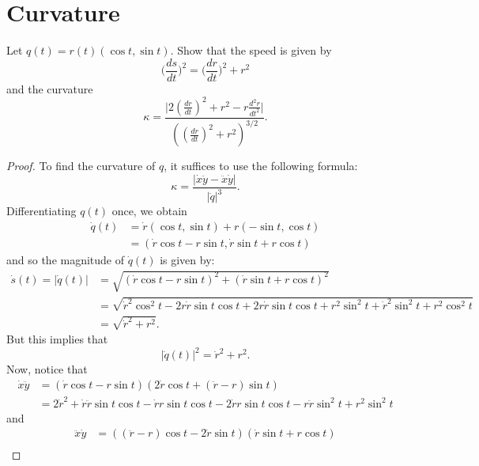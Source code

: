 \documentclass[a4paper]{article}
\begin{document}
\section{Curvature}

\begin{problem}
    Let \( q(t) = r(t) (\cos t , \sin t ) \). Show that the speed is given by
    \[  \Big(  \frac{ ds  }{ dt }  \Big)^{2} = \Big(  \frac{ dr }{ dt }  \Big)^{2} + r^{2} \]
    and the curvature 
    \[  \kappa = \frac{ \Big| 2 (\frac{ dr }{ dt })^{2} + r^{2} - r \frac{ d^{2} r  }{ d t^{2} }   \Big|  }{  ((\frac{ dr }{ dt } )^{2} + r^{2})^{3/2} }. \]
\end{problem}
\begin{proof}
    To find the curvature of \( q  \), it suffices to use the following formula: 
    \[  \kappa = \frac{ | \dot{x} \ddot{y} - \ddot{x} \dot{y} |  }{ | \dot{q} |^{3} }. \]
    Differentiating \( q(t) \) once, we obtain
    \begin{align*}
        \dot{q}(t) &= \dot{r} (\cos t , \sin t ) + r(- \sin t , \cos t)  \\
                   &= (\dot{r} \cos t - r \sin t , \dot{r} \sin t + r \cos t ) 
    \end{align*}
    and so the magnitude of \( \dot{q}(t)  \) is given by:
    \begin{align*}
        \dot{s}(t) =  |\dot{q}(t)| &= \sqrt{ (\dot{r} \cos t - r \sin t)^{2} + (\dot{r} \sin t + r \cos t )^{2} }  \\
                       &= \sqrt{ \dot{r}^{2} \cos^{2}t - 2 r \dot{r} \sin t \cos t + 2 r \dot{r} \sin t \cos t + r^{2} \sin^{2}t  + \dot{r}^{2} \sin^{2} t + r^{2} \cos^{2}t  } \\
                       &= \sqrt{ \dot{r}^{2} + r^{2} }.
    \end{align*}
    But this implies that 
    \[  |\dot{q}(t)|^{2} = \dot{r}^{2} + r^{2}. \]
    Now, notice that 
    \begin{align*}
        \dot{x} \ddot{y} &= (\dot{r} \cos t - r \sin t )(2 \dot{r} \cos t + (\ddot{r} - r)\sin t) \\
                         &= 2 \dot{r}^{2} + \dot{r} \ddot{r} \sin t \cos t - \dot{r} r \sin t \cos t - 2 \dot{r} r \sin t \cos t - r \ddot{r} \sin^{2}t + r^{2} \sin^{2} t
    \end{align*}
    and
    \begin{align*}
        \ddot{x} \dot{y} &= ((\ddot{r} - r) \cos t - 2 \dot{r} \sin t) (\dot{r} \sin t + r \cos t) \\

\end{align*}
\end{proof}
\end{document}
